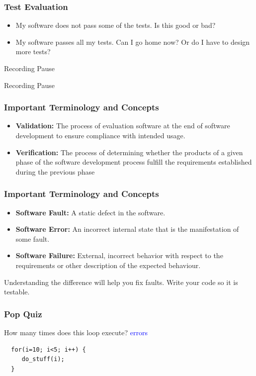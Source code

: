 \documentclass{beamer}
\begin{document}
\begin{frame}
  \frametitle{Test Evaluation}
  \begin{itemize}
  \item My software does not pass some of the tests. Is this good or
    bad?
  \item My software passes all my tests. Can I go home now? Or do I
    have to design more tests?
  \end{itemize}
\end{frame}
\begin{frame}{Recording Pause}
  \begin{center}
    Recording Pause
  \end{center}
\end{frame}

\begin{frame}
  \frametitle{Important Terminology and Concepts}

  \begin{itemize}
  \item {\bf Validation:} The process of evaluation software at the end
    of software development to ensure compliance with intended usage.
  \item {\bf Verification:} The process of determining whether the
    products of a given phase of the software development process
    fulfill the requirements established during the previous phase
  \end{itemize}
  
\end{frame}
\begin{frame}
  \frametitle{Important Terminology and Concepts}
  \begin{itemize}
  \item  {\bf Software Fault:} A static defect in the software.
  \item {\bf Software Error:} An incorrect internal state that is the
    manifestation of some fault. 
  \item {\bf  Software Failure:} External,
    incorrect behavior with respect to the requirements or other
    description of the expected behaviour.
  \end{itemize}
Understanding the difference will help you fix faults. Write your code
so it is testable.
\end{frame}
\begin{frame}[fragile]
  \frametitle{Pop Quiz}
  How many times does this loop execute?
 \textcolor{blue}{errors}\begin{lstlisting}
  for(i=10; i<5; i++) {
     do_stuff(i);
  }
\end{lstlisting}

\end{frame}
\end{document}
